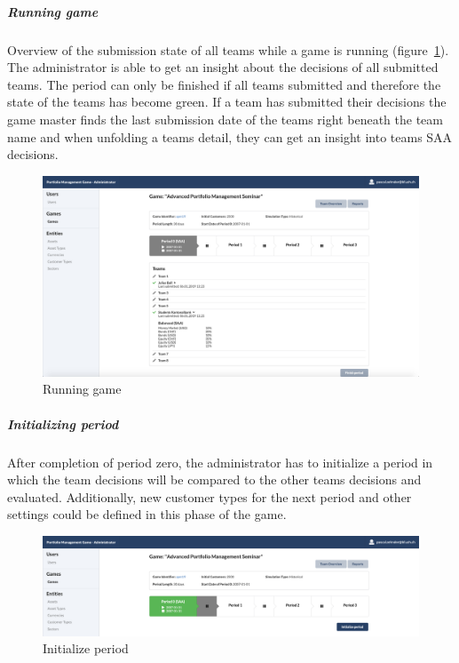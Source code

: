 \subparagraph{Running game}
Overview of the submission state of all teams while a game is running (figure~\ref{fig:running_game}). The administrator is able to get an insight about the decisions of all submitted teams. The period can only be finished if all teams submitted and therefore the state of the teams has become green. If a team has submitted their decisions the game master finds the last submission date of the teams right beneath the team name and when unfolding a teams detail, they can get an insight into teams SAA decisions.
\begin{figure}[h!]
  \centering
  \includegraphics[scale=0.2]{img/application-overview/administrator/07_running_game.png}
  \caption{Running game}
  \label{fig:running_game}
\end{figure}

\subparagraph{Initializing period}
After completion of period zero, the administrator has to initialize a period in which the team decisions will be compared to the other teams decisions and evaluated. Additionally, new customer types for the next period and other settings could be defined in this phase of the game.
\begin{figure}[h!]
  \centering
  \includegraphics[scale=0.2]{img/application-overview/administrator/08_period_initialization.png}
  \caption{Initialize period}
\end{figure}


